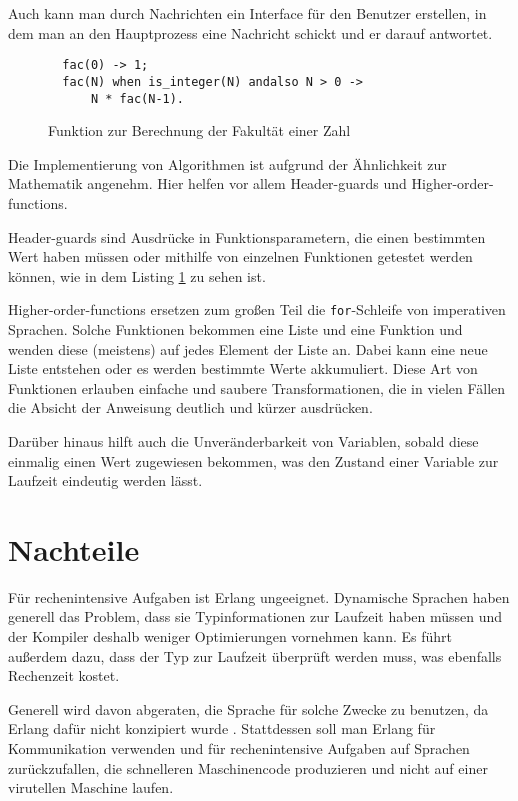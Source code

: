 Auch kann man durch Nachrichten ein Interface für den Benutzer
erstellen, in dem man an den Hauptprozess eine Nachricht schickt und
er darauf antwortet.

\medskip
\renewcommand{\figurename}{Listing}
\begin{figure}[ht]
  \centering
  \begin{lstlisting}
  fac(0) -> 1;
  fac(N) when is_integer(N) andalso N > 0 ->
      N * fac(N-1).
    \end{lstlisting}
    \caption{\label{lst:fac} Funktion zur Berechnung der Fakultät einer Zahl}
\end{figure}
\renewcommand{\figurename}{Abbildung}


Die Implementierung von Algorithmen ist aufgrund der Ähnlichkeit zur
Mathematik angenehm.  Hier helfen vor allem Header-guards und
Higher-order-functions.

Header-guards sind Ausdrücke in Funktionsparametern, die einen
bestimmten Wert haben müssen oder mithilfe von einzelnen Funktionen
getestet werden können, wie in dem Listing \ref{lst:fac} zu sehen ist.

Higher-order-functions ersetzen zum großen Teil die
\lstinline!for!-Schleife von imperativen Sprachen.  Solche Funktionen
bekommen eine Liste und eine Funktion und wenden diese (meistens) auf
jedes Element der Liste an.  Dabei kann eine neue Liste entstehen oder
es werden bestimmte Werte akkumuliert.  Diese Art von Funktionen
erlauben einfache und saubere Transformationen, die in vielen Fällen
die Absicht der Anweisung deutlich und kürzer ausdrücken.

Darüber hinaus hilft auch die Unveränderbarkeit von Variablen, sobald
diese einmalig einen Wert zugewiesen bekommen, was den Zustand einer
Variable zur Laufzeit eindeutig werden lässt.

\section{Nachteile}
\label{sec:disadv}
Für rechenintensive Aufgaben ist Erlang ungeeignet.  Dynamische
Sprachen haben generell das Problem, dass sie Typinformationen zur
Laufzeit haben müssen und der Kompiler deshalb weniger Optimierungen
vornehmen kann.  Es führt außerdem dazu, dass der Typ zur Laufzeit
überprüft werden muss, was ebenfalls Rechenzeit kostet.

Generell wird davon abgeraten, die Sprache für solche Zwecke zu
benutzen, da Erlang dafür nicht konzipiert wurde
\cite[Kapitel~3]{lyse}.  Stattdessen soll man Erlang für Kommunikation
verwenden und für rechenintensive Aufgaben auf Sprachen
zurückzufallen, die schnelleren Maschinencode produzieren und nicht
auf einer virutellen Maschine laufen.

